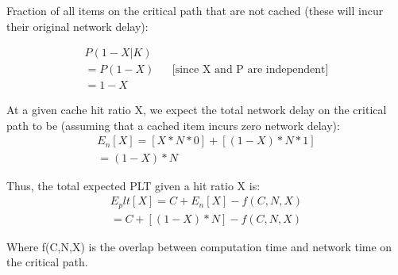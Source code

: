 Fraction of all items on the critical path that are not cached (these will incur their original network delay):

\begin{align*}
P(1-X | K) \\
= P(1-X) && \text{[since X and P are independent]} \\
= 1-X
\end{align*}

At a given cache hit ratio X, we expect the total network delay on the critical path to be (assuming that a cached item incurs zero network delay):
\begin{align*}
E_n[X] = [X * N * 0] + [(1 - X) * N * 1] \\
= (1 - X) * N
\end{align*}

Thus, the total expected PLT given a hit ratio X is:
\begin{align*}
E_plt[X] = C + E_n[X] - f(C,N,X) \\
= C + [(1 - X) * N] - f(C,N,X)
\end{align*}

Where f(C,N,X) is the overlap between computation time and network time on the critical path.